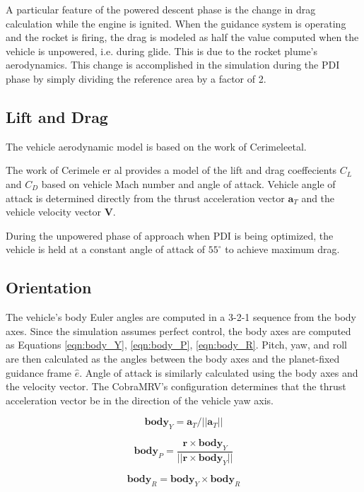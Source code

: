A particular feature of the powered descent phase is the change in drag calculation while the engine is ignited. When the guidance system is operating and the rocket is firing, the drag is modeled as half the value computed when the vehicle is unpowered, i.e. during glide. This is due to the rocket plume's aerodynamics. This change is accomplished in the simulation during the PDI phase by simply dividing the reference area by a factor of 2. 

\subsection{Lift and Drag}
The vehicle aerodynamic model is based on the work of Cerimele\:et\:al\:\cite{CERIMELE}. 

The work of Cerimele er al provides a model of the lift and drag coeffecients $C_L$ and $C_D$ based on vehicle Mach number and angle of attack. Vehicle angle of attack is determined directly from the thrust acceleration vector $\bm{a}_T$ and the vehicle velocity vector $\bm{V}$. 

During the unpowered phase of approach when PDI is being optimized, the vehicle is held at a constant angle of attack of $55^{\circ}$ to achieve maximum drag. 

\subsection{Orientation}
The vehicle's body Euler angles are computed in a 3-2-1 sequence from the body axes. Since the simulation assumes perfect control, the body axes are computed as Equations \ref{eqn:body_Y}, \ref{eqn:body_P}, \ref{eqn:body_R}. Pitch, yaw, and roll are then calculated as the angles between the body axes and the planet-fixed guidance frame $\hat{e}$. Angle of attack is similarly calculated using the body axes and the velocity vector. The CobraMRV's configuration determines that the thrust acceleration vector be in the direction of the vehicle yaw axis.

\begin{equation}
\label{eqn:body_Y}
\bm{body}_Y = \bm{a}_T/||\bm{a}_T||
\end{equation}

\begin{equation}
\label{eqn:body_P}
\bm{body}_P = \frac{\bm{r} \times \bm{body}_Y}{||\bm{r} \times \bm{body}_Y||}
\end{equation}

\begin{equation}
\label{eqn:body_R}
\bm{body}_R = \bm{body}_Y \times \bm{body}_R
\end{equation}

